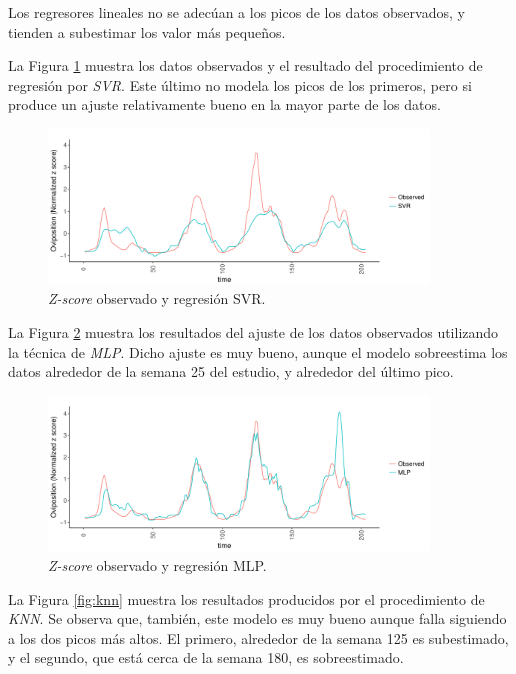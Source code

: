     \par Los regresores lineales no se adecúan a los picos de los datos
    observados, y tienden a subestimar los valor más pequeños.

    \par La Figura \ref{fig:svr} muestra los datos observados y el resultado
      del procedimiento de regresión por \textit{SVR}. Este último no modela los
      picos de los primeros, pero si produce un ajuste relativamente bueno
      en la mayor parte de los datos.
      \begin{figure}[hbt]
      \centering%
      \includegraphics[width=0.9\textwidth]{images/svr}%
      \caption{\textit{Z-score} observado y regresión SVR.}\label{fig:svr}
      \end{figure}


    \par La Figura \ref{fig:mlp} muestra los resultados del ajuste de
    los datos observados utilizando la técnica de \textit{MLP}. Dicho ajuste es muy
    bueno, aunque el modelo sobreestima los datos alrededor de la semana 25
    del estudio, y alrededor del último pico.
      \begin{figure}[hbt]
      \centering%
      \includegraphics[width=0.9\textwidth]{images/mlp}%
      \caption{\textit{Z-score} observado y regresión MLP.}\label{fig:mlp}
      \end{figure}


  \par La Figura \ref{fig:knn} muestra los resultados producidos por el procedimiento
    de \textit{KNN}. Se observa que, también, este modelo es muy bueno aunque
    falla siguiendo a los dos picos más altos. El primero, alrededor de la semana
    125 es subestimado, y el segundo, que está cerca de la semana 180, es
    sobreestimado.

